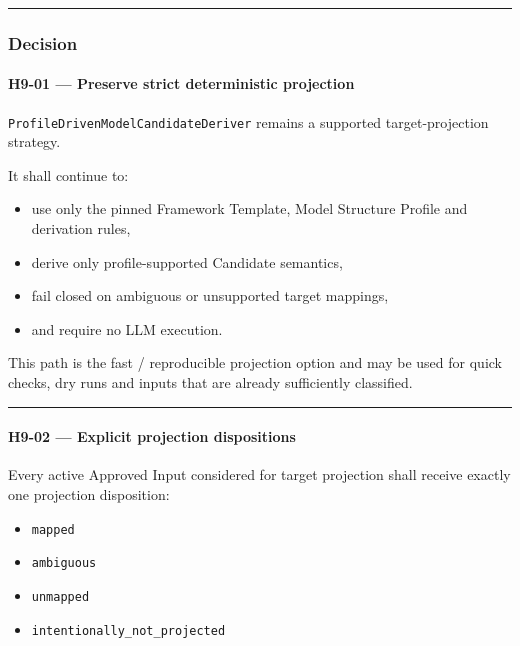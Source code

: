 \begin{center}\rule{0.5\linewidth}{0.5pt}\end{center}

\hypertarget{decision-5}{%
\subsubsection{Decision}\label{decision-5}}

\hypertarget{h9-01--preserve-strict-deterministic-projection}{%
\paragraph{H9-01 --- Preserve strict deterministic projection}\label{h9-01--preserve-strict-deterministic-projection}}

\texttt{ProfileDrivenModelCandidateDeriver} remains a supported target-projection strategy.

It shall continue to:

\begin{itemize}
\tightlist
\item
  use only the pinned Framework Template, Model Structure Profile and derivation rules,
\item
  derive only profile-supported Candidate semantics,
\item
  fail closed on ambiguous or unsupported target mappings,
\item
  and require no LLM execution.
\end{itemize}

This path is the fast / reproducible projection option and may be used for quick checks, dry runs and inputs that are already sufficiently classified.

\begin{center}\rule{0.5\linewidth}{0.5pt}\end{center}

\hypertarget{h9-02--explicit-projection-dispositions}{%
\paragraph{H9-02 --- Explicit projection dispositions}\label{h9-02--explicit-projection-dispositions}}

Every active Approved Input considered for target projection shall receive exactly one projection disposition:

\begin{itemize}
\tightlist
\item
  \texttt{mapped}
\item
  \texttt{ambiguous}
\item
  \texttt{unmapped}
\item
  \texttt{intentionally\_not\_projected}
\end{itemize}

